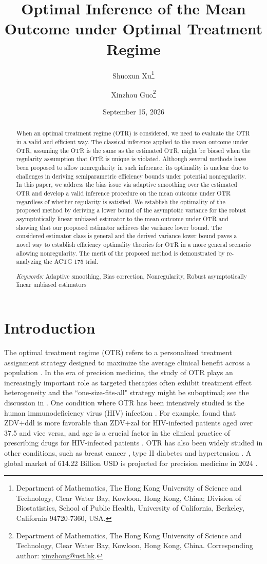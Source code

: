 \documentclass[11pt]{article}
\title{Optimal Inference of the Mean Outcome under Optimal Treatment Regime}
\author{
Shuoxun Xu\thanks{Department of Mathematics, The Hong Kong University of Science and Technology, Clear Water Bay, Kowloon, Hong Kong, China; Division of Biostatistics, School of Public Health, University of California, Berkeley, California 94720-7360, USA.}
\and
Xinzhou Guo\thanks{Department of Mathematics, The Hong Kong University of Science and Technology, Clear Water Bay, Kowloon, Hong Kong, China. Corresponding author: \href{mailto:xinzhoug@ust.hk}{xinzhoug@ust.hk}.}
}
\date{September 15, 2026}
\theoremstyle{referenceplain}
\theoremstyle{referencedefinition}
\theoremstyle{referenceremark}
\begin{document}
\maketitle

\begin{abstract}
When an optimal treatment regime (OTR) is considered, we need to evaluate the OTR in a valid and efficient way. The classical inference applied to the mean outcome under OTR, assuming the OTR is the same as the estimated OTR, might be biased when the regularity assumption that OTR is unique is violated. Although several methods have been proposed to allow nonregularity in such inference, its optimality is unclear due to challenges in deriving semiparametric efficiency bounds under potential nonregularity. In this paper, we address the bias issue via adaptive smoothing over the estimated OTR and develop a valid inference procedure on the mean outcome under OTR regardless of whether regularity is satisfied. We establish the optimality of the proposed method by deriving a lower bound of the asymptotic variance for the robust asymptotically linear unbiased estimator to the mean outcome under OTR and showing that our proposed estimator achieves the variance lower bound. The considered estimator class is general and the derived variance lower bound paves a novel way to establish efficiency optimality theories for OTR in a more general scenario allowing nonregularity. The merit of the proposed method is demonstrated by re-analyzing the ACTG 175 trial.


\medskip
\noindent\textit{Keywords:} Adaptive smoothing, Bias correction, Nonregularity, Robust asymptotically linear unbiased estimators
\end{abstract}

\doublespacing

\section{Introduction}
The optimal treatment regime (OTR) refers to a personalized treatment assignment strategy designed to maximize the average clinical benefit across a population \citep{li2023optimal}. In the era of precision medicine, the study of OTR plays an increasingly important role as targeted therapies often exhibit treatment effect heterogeneity and the ``one-size-fits-all" strategy might be suboptimal; see the discussion in \citet{malone2014good}. One condition where OTR has been intensively studied is the human immunodeficiency virus (HIV) infection \citep{farahmandpour2023personalized}. For example, \citet{fan2017concordance} found that ZDV+ddl is more favorable than ZDV+zal for HIV-infected patients aged over 37.5 and vice versa, and age is a crucial factor in the clinical practice of prescribing drugs for HIV-infected patients \citep{cardoso2013aging}. OTR has also been widely studied in  other conditions, such as breast cancer \citep{sparano2018adjuvant}, type II diabetes \citep{gaede2008effect} and hypertension \citep{sprint2015randomized}.  A global market of 614.22 Billion USD is projected for precision medicine in 2024 \citep{precedence2024}.
\end{document}
